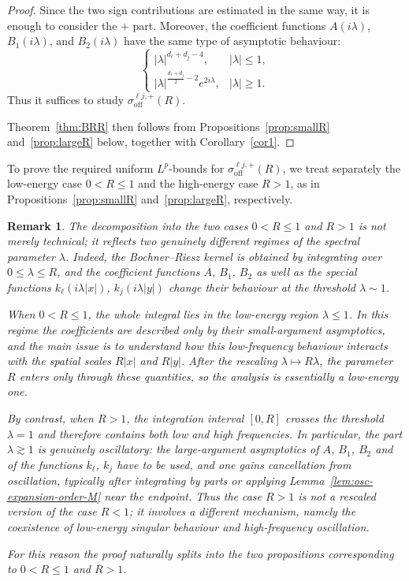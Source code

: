 \documentclass[12pt]{amsart}
\newtheorem{remark}[theorem]{Remark}
\begin{document}
\begin{proof}
Since the two sign contributions are estimated in the same way, it is
enough to consider the \(+\) part. Moreover, the coefficient functions
\(A(i\lambda)\), \(B_1(i\lambda)\), and \(B_2(i\lambda)\) have the same
type of asymptotic behaviour:
\[
    \begin{cases}
        |\lambda|^{d_\ell+d_j-4}, & |\lambda|\le 1,\\[1mm]
        |\lambda|^{\frac{d_\ell+d_j}{2}-2}e^{2i\lambda},
        & |\lambda|\ge 1.
    \end{cases}
\]
Thus it suffices to study
\(\sigma_{\mathrm{off}}^{\ell j,+}(R)\).

Theorem~\ref{thm:BRR} then follows from
Propositions~\ref{prop:smallR} and~\ref{prop:largeR} below, together with
Corollary~\ref{cor1}.


\end{proof}



To prove the required uniform \(L^p\)-bounds for
\(\sigma_{\mathrm{off}}^{\ell j,+}(R)\), we treat separately the
low-energy case \(0<R\leq 1\) and the high-energy case \(R>1\), as in
Propositions~\ref{prop:smallR} and~\ref{prop:largeR}, respectively.


\begin{remark}
The decomposition into the two cases $0<R\le 1$ and $R>1$ is not merely technical; it reflects two genuinely different regimes of the spectral parameter $\lambda$. Indeed, the Bochner--Riesz kernel is obtained by integrating over $0\le \lambda\le R$, and the coefficient functions $A$, $B_1$, $B_2$ as well as the special functions $k_\ell(i\lambda|x|)$, $k_j(i\lambda|y|)$ change their behaviour at the threshold $\lambda\sim 1$.

When $0<R\le 1$, the whole integral lies in the low-energy region $\lambda\le 1$. In this regime the coefficients are described only by their small-argument asymptotics, and the main issue is to understand how this low-frequency behaviour interacts with the spatial scales $R|x|$ and $R|y|$. After the rescaling $\lambda\mapsto R\lambda$, the parameter $R$ enters only through these quantities, so the analysis is essentially a low-energy one.

By contrast, when $R>1$, the integration interval $[0,R]$ crosses the threshold $\lambda=1$ and therefore contains both low and high frequencies. In particular, the part $\lambda\gtrsim 1$ is genuinely oscillatory: the large-argument asymptotics of $A$, $B_1$, $B_2$ and of the functions $k_\ell$, $k_j$ have to be used, and one gains cancellation from oscillation, typically after integrating by parts or applying Lemma~\ref{lem:osc-expansion-order-M} near the endpoint. Thus the case $R>1$ is not a rescaled version of the case $R<1$; it involves a different mechanism, namely the coexistence of low-energy singular behaviour and high-frequency oscillation.

For this reason the proof naturally splits into the two propositions corresponding to $0<R\le 1$ and $R>1$.
\end{remark}
\end{document}
